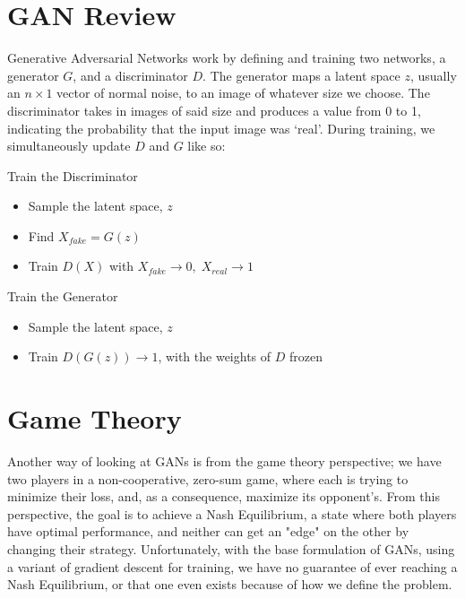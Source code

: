 \documentclass{article}
\begin{document}
\section{GAN Review}

Generative Adversarial Networks work by defining and training two networks, a generator $G$, and a discriminator $D$. The generator maps a latent space $z$, usually an $n\times1$ vector of normal noise, to an image of whatever size we choose. The discriminator takes in images of said size and produces a value from 0 to 1, indicating the probability that the input image was `real'. During training, we simultaneously update $D$ and $G$ like so:

\begin{multicols}{2}

Train the Discriminator
\begin{itemize}
    \item Sample the latent space, $z$
    \item Find $X_{fake} = G(z)$
    \item Train $D(X)$ with $X_{fake}\xrightarrow{}0,\; X_{real}\xrightarrow{}1$
\end{itemize}

\vspace{0.1in}

Train the Generator
\begin{itemize}
    \item Sample the latent space, $z$
    \item Train $D(G(z))\xrightarrow{}1$, with the weights of $D$ frozen
\end{itemize}

\end{multicols}

\section{Game Theory}

Another way of looking at GANs is from the game theory perspective; we have two players in a non-cooperative, zero-sum game, where each is trying to minimize their loss, and, as a consequence, maximize its opponent's. From this perspective, the goal is to achieve a Nash Equilibrium, a state where both players have optimal performance, and neither can get an "edge" on the other by changing their strategy. Unfortunately, with the base formulation of GANs, using a variant of gradient descent for training, we have no guarantee of ever reaching a Nash Equilibrium, or that one even exists because of how we define the problem.
\end{document}
